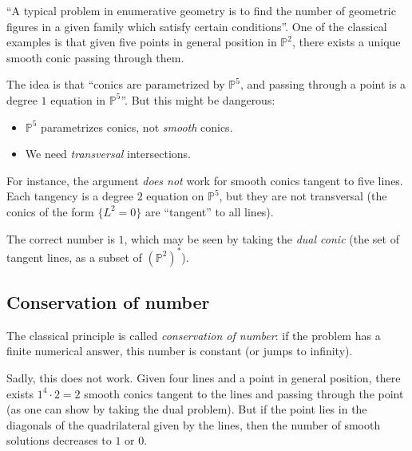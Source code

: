 \documentclass[leqno, openany]{memoir}
\theoremstyle{definition}
\theoremstyle{remark}
\theoremstyle{plain}
\theoremstyle{definition}
\theoremstyle{remark}
\renewcommand{\P}{\mathbb{P}}
\begin{document}
``A typical problem in enumerative geometry is to find the number of geometric figures in a given family which satisfy certain conditions''.  One of the classical examples is that given five points in general position in $\P^2$, there exists a unique smooth conic passing through them. 
\begin{figure}[H]
\centering 
{}
\end{figure}

The idea is that ``conics are parametrized by $\P^5$, and passing through a point is a degree $1$ equation in $\P^5$''.  But this might be dangerous:
\begin{itemize}
\item $\P^5$ parametrizes conics, not \emph{smooth} conics.
\item We need \emph{transversal} intersections.
\end{itemize}

For instance, the argument \emph{does not} work for  smooth conics tangent to five lines. Each tangency is a degree $2$ equation on $\P^5$, but they are not transversal (the conics of the form $\{L^2=0\}$ are ``tangent'' to all lines). 

The correct number is $1$, which may be seen by taking the \emph{dual conic} (the set of tangent lines, as a subset of ${ (\P^2) }^\ast$).

\subsection{Conservation of number}%
\label{sub:conservation_of_number}

The classical principle is called \emph{conservation of number}: if the problem has a finite numerical answer, this number is constant (or jumps to infinity).

Sadly, this does not work. Given four lines and a point in general position, there exists $1^4 \cdot 2=2$ smooth conics tangent to the lines and passing through the point (as one can show by taking the dual problem). But if the point lies in the diagonals of the quadrilateral given by the lines, then the number of smooth solutions decreases to $1$ or $0$. 
\end{document}
